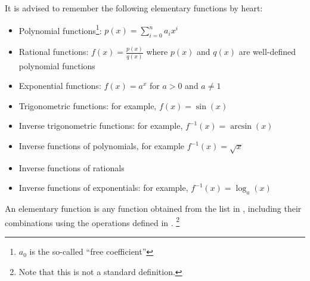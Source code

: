 \begin{rem}\label{rem-elementary-functions}
    It is advised to remember the following elementary functions by heart:
    \begin{itemize}
        \item Polynomial functions\footnote{$a_0$ is the so-called \enquote{free coefficient}}: $p(x)=\sum_{i=0}^na_ix^i$
        \item Rational functions: $f(x)=\tfrac{p(x)}{q(x)}$ where $p(x)$ and $q(x)$ are well-defined polynomial functions
        \item Exponential functions: $f(x)=a^x$ for $a>0$ and $a\neq 1$
        \item Trigonometric functions: for example, $f(x)=\sin(x)$
        \item Inverse trigonometric functions: for example, $f^{-1}(x)=\arcsin(x)$
        \item Inverse functions of polynomials, for example $f^{-1}(x)=\sqrt{x}$
        \item Inverse functions of rationals
        \item Inverse functions of exponentials: for example, $f^{-1}(x)=\log_a(x)$
    \end{itemize}
\end{rem}

\begin{definition}\label{def-elementary-functions}
    An elementary function is any function obtained from the list in ,
    including their combinations using the operations defined in .
    \footnote{Note that this is not a standard definition.}
\end{definition}
